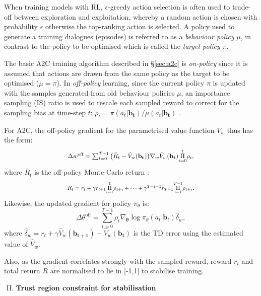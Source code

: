 \documentclass[11pt,a4paper]{article}
\newcommand*{\Scale}[2][4]{\scalebox{#1}{$#2$}}%
\begin{document}
When training models with RL, $\epsilon$-greedy action selection is often used to trade-off between exploration and exploitation,
whereby a random action is chosen with probability $\epsilon$ 
otherwise the top-ranking action is selected. 
A policy used to generate a training dialogues (episodes) is referred to as a {\it behaviour policy} $\mu$, in contrast to the policy to be optimised which is called the {\it target policy} $\pi$.

The basic A2C training algorithm described in \S \ref{sec:a2c}
is {\it on-policy} since it is  assumed that actions are drawn from the same policy as the target to be optimised 
($\mu = \pi$). 
In {\it off-policy} learning, since the current policy $\pi$ is updated with the samples generated from old behaviour policies $\mu$, an importance sampling (IS) ratio is used to rescale each sampled reward to correct for the sampling bias at time-step $t$: $\rho_t = {\pi(a_t|\mathbf{b_t})}/{\mu(a_t|\mathbf{b_t})}$ \cite{meuleau2000off}.

For A2C, the off-policy gradient for the parametrised value function $V_w$ thus has the form:
\begin{equation}
\Scale[0.90]{\Delta w^{\textrm{off}} = \sum_{t=0}^{T-1} \big( \bar{R}_t-\hat V_w(\mathbf{b_t})\big)\nabla_w\hat V_w(\mathbf{b_t}) \underset{i=0}{\overset{t}{\Pi}}\rho_i,}
\label{eq:off_policy_value}
\end{equation}
where $\bar{R}_t$ is the off-policy Monte-Carlo return \cite{precup2001off}:
\begin{equation}
\Scale[0.8]{ \bar{R}_t =  r_{t} + \gamma r_{t+1} \underset{i=1}{\overset{1}{\Pi}}\rho_{t+i} + \cdots + \gamma^{T-t-1} r_{T-1} \underset{i=1}{\overset{T-1}{\Pi}}\rho_{t+i} }.
\label{eq:off_policy_mc_return}
\end{equation}
Likewise, the updated gradient for policy $\pi_\theta$ is:
\begin{equation}
\label{eq:pg}
\Delta \theta^{\textrm{off}} = \sum_{t=0}^{T-1}\rho_t \nabla_{\bm{\theta}} \log \pi_{\theta}(a_t|\mathbf{b}_t) \hat \delta_w,
\end{equation}
where $\hat \delta_w = r_{t} + \gamma \hat V_w(\mathbf{b_{t+1}}) - \hat V_w(\mathbf{b_{t}})$ is the TD error using the estimated value of $\hat V_w$.

Also, as the gradient correlates strongly with the sampled reward, reward $r_t$ and total return $R$ are normalised to lie in [-1,1] to stabilise training.

\begin{enumerate}[I.]
  \setcounter{enumi}{1}
  \item {\bf Trust region constraint for stabilisation}
\end{enumerate}
\end{document}
